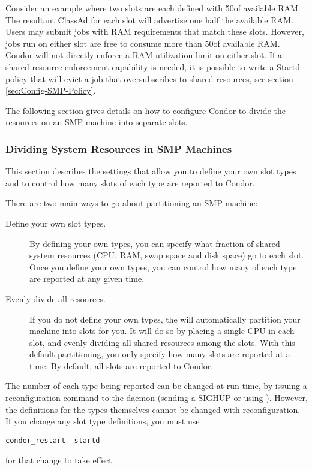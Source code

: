 Consider an example where two slots are each defined with 50\Percent of
available RAM.  The resultant ClassAd for each slot will advertise one
half the available RAM.  Users may submit jobs with RAM requirements
that match these slots.  However, jobs run on either slot are free to
consume more than 50\Percent of available RAM.  Condor will not
directly enforce a RAM utilization limit on either slot.  If a shared
resource enforcement capability is needed, it is possible to write a
Startd policy that will evict a job that oversubscribes to shared
resources, see section \ref{sec:Config-SMP-Policy}.

The following section gives details on how to configure Condor to
divide the resources on an SMP machine into separate slots.

\subsubsection{\label{sec:SMP-Divide}
Dividing System Resources in SMP Machines}

This section describes the settings that allow you to define your own
slot types and to control how many slots of each
type are reported to Condor.

There are two main ways to go about partitioning an SMP machine:

\begin{description}

\item[Define your own slot types.]
  By defining your own types, you can specify what fraction of shared
  system resources (CPU, RAM, swap space and disk space) go to each
  slot.
  Once you define your own types, you can control how many of each
  type are reported at any given time.

\item[Evenly divide all resources.]  
  If you do not define your own types, the  will
  automatically	partition your machine into slots for you.
  It will do so by placing a single CPU in each slot, and evenly dividing
  all shared resources among the slots.
  With this default partitioning, you only specify how many
  slots are reported at a time.
  By default, all slots are reported to Condor.

\end{description}

The number of each type being
reported can be changed at run-time, by issuing a reconfiguration
command to
the  daemon (sending a SIGHUP or using ).
However, the definitions for the types themselves cannot be changed
with reconfiguration.
If you change any slot type definitions, you must use 
\begin{verbatim}
condor_restart -startd
\end{verbatim}
for that change to take effect.

